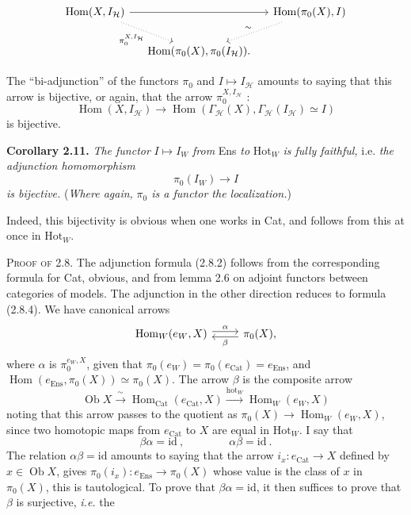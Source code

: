 \documentclass[11pt]{article}
\newcommand{\printedpage}[1]{\marginpar{\footnotesize p.~#1}}
\newcommand{\msp}[1]{\marginpar{\footnotesize [#1]}}
\newcommand{\Hom}{\operatorname{Hom}}
\newcommand{\Ob}{\operatorname{Ob}}
\newcommand{\Hot}{\mathrm{Hot}}
\newcommand{\Cat}{\mathrm{Cat}}
\newcommand{\Ens}{\mathrm{Ens}}
\newcommand{\id}{\mathrm{id}}
\begin{document}
\printedpage{9}

\[
\begin{tikzcd}[column sep=small]
\Hom(X,I_{\mathcal{H}}) \arrow[rr] \arrow[dr,dotted,"\pi_0^{X,I_{\mathcal{H}}}"'] & & \Hom(\pi_0(X),I) \arrow[dl,dotted,"\sim"'] \\ %
& \Hom(\pi_0(X),\pi_0(I_{\mathcal{H}})). &
\end{tikzcd}
\]

The ``bi-adjunction'' of the functors $\pi_0$ and $I\longmapsto I_{\mathcal{H}}$ amounts to saying that this arrow is bijective,
\msp{17}
or again, that the arrow $\pi_0^{X,I_{\mathcal{H}}}$ :
\[
\Hom(X,I_{\mathcal{H}})\longrightarrow\Hom(\Gamma_{\mathcal{H}}(X),\Gamma_{\mathcal{H}}(I_{\mathcal{H}})\simeq I)
\]
is bijective.

\textbf{Corollary 2.11.} \textit{The functor} $I\longmapsto I_W$ \textit{from} Ens \textit{to} $\Hot_W$ \textit{is fully faithful,} i.e. \textit{the adjunction homomorphism}
\[
\pi_0(I_W)\longrightarrow I
\]
\textit{is bijective.} (\textit{Where again,} %
\textit{$\pi_0$ is a functor the localization.}) %

Indeed, this bijectivity is obvious when one works in Cat, and follows from this at once in $\Hot_W$.

\textsc{Proof of} 2.8. The adjunction formula (2.8.2) follows from the corresponding formula for Cat, obvious, and from lemma 2.6 on adjoint functors between categories of models. The adjunction in the other direction reduces to formula (2.8.4). We have canonical arrows
\[
\begin{tikzcd}
\Hom_W(e_W,X) \arrow[r,shift left,"\alpha"] & \pi_0(X), \arrow[l,shift left,"\beta"]
\end{tikzcd}
\]
where $\alpha$ is $\pi_0^{e_W,X}$, given that $\pi_0(e_W)=\pi_0(e_{\Cat})=e_{\Ens}$, and $\Hom(e_{\Ens},\pi_0(X))\simeq\pi_0(X)$. The arrow $\beta$ is the composite arrow
\[
\Ob X\xrightarrow{\ \sim\ }\Hom_{\Cat}(e_{\Cat},X)\xrightarrow{\mathrm{hot}_W}\Hom_W(e_W,X)
\]
\msp{18}
noting that this arrow passes to the quotient as $\pi_0(X)\longrightarrow\Hom_W(e_W,X)$, since two homotopic maps from $e_{\Cat}$ to $X$ are equal in $\Hot_W$. I say that
\[
\beta\alpha=\id\ ,\qquad\qquad \alpha\beta=\id\ .
\]
The relation $\alpha\beta=\id$ amounts to saying that the arrow $i_x : e_{\Cat}\longrightarrow X$ defined by $x\in\Ob X$, gives $\pi_0(i_x) : e_{\Ens}\longrightarrow\pi_0(X)$ whose value is the class of $x$ in $\pi_0(X)$, this is tautological. To prove that $\beta\alpha=\id$, it then suffices to prove that $\beta$ is surjective, \textit{i.e.} the
\end{document}
